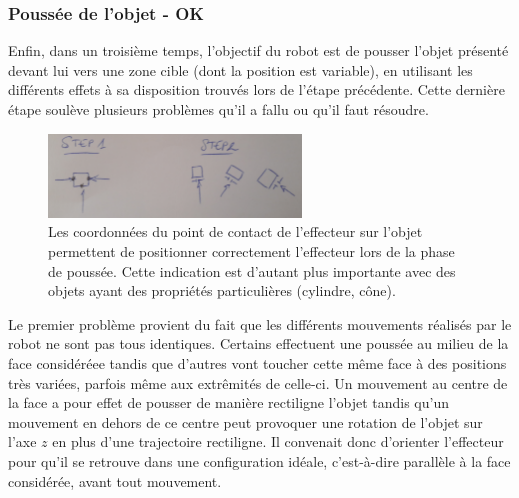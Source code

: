 \documentclass[draft]{llncs}
\begin{document}
\subsubsection{Poussée de l'objet - OK}

Enfin, dans un troisième temps, l'objectif du robot est de pousser l'objet présenté devant lui vers une zone cible (dont la position est variable), en utilisant les différents effets à sa disposition trouvés lors de l'étape précédente.
Cette dernière étape soulève plusieurs problèmes qu'il a fallu ou qu'il faut résoudre.


\begin{figure}[ht]
  \begin{center}
  \includegraphics[width=0.6\textwidth]{figures/effector_problems.jpg}
    \caption{Les coordonnées du point de contact de l'effecteur sur l'objet permettent de positionner correctement l'effecteur lors de la phase de poussée. Cette indication est d'autant plus importante avec des objets ayant des propriétés particulières (cylindre, cône).}
  \label{fig:effector_problems}
  \end{center}
\end{figure}

Le premier problème provient du fait que les différents mouvements réalisés par le robot ne sont pas tous identiques.
Certains effectuent une poussée au milieu de la face considéréee tandis que d'autres vont toucher cette même face à des positions très variées, parfois même aux extrêmités de celle-ci.
Un mouvement au centre de la face a pour effet de pousser de manière rectiligne l'objet tandis qu'un mouvement en dehors de ce centre peut provoquer une rotation de l'objet sur l'axe $z$ en plus d'une trajectoire rectiligne.
Il convenait donc d'orienter l'effecteur pour qu'il se retrouve dans une configuration idéale, c'est-à-dire parallèle à la face considérée, avant tout mouvement.
\end{document}
